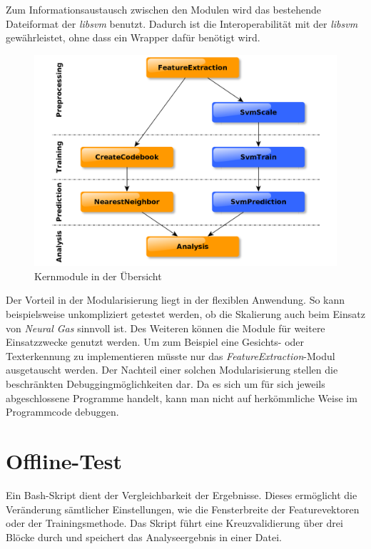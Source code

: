 Zum Informationsaustausch zwischen den Modulen wird das bestehende Dateiformat der \emph{libsvm} benutzt. Dadurch ist die Interoperabilität mit der \emph{libsvm} gewährleistet, ohne dass ein Wrapper dafür benötigt wird.

\begin{figure}[h]
  \centering
  \includegraphics[width=1\textwidth]{images/moduluebersicht}
  \caption{Kernmodule in der Übersicht}
  \label{fig:moduluebersicht}
\end{figure}

Der Vorteil in der Modularisierung liegt in der flexiblen Anwendung. So kann beispielsweise unkompliziert getestet werden, ob die Skalierung auch beim Einsatz von \emph{Neural Gas} sinnvoll ist. Des Weiteren können die Module für weitere Einsatzzwecke genutzt werden. Um zum Beispiel eine Gesichts- oder Texterkennung zu implementieren müsste nur das \emph{FeatureExtraction}-Modul ausgetauscht werden. Der Nachteil einer solchen Modularisierung stellen die beschränkten Debuggingmöglichkeiten dar. Da es sich um für sich jeweils abgeschlossene Programme handelt, kann man nicht auf herkömmliche Weise im Programmcode debuggen.

\section{Offline-Test}
Ein Bash-Skript dient der Vergleichbarkeit der Ergebnisse. Dieses ermöglicht die Veränderung sämtlicher Einstellungen, wie die Fensterbreite der Featurevektoren oder der Trainingsmethode. Das Skript führt eine Kreuzvalidierung über drei Blöcke durch und speichert das Analyseergebnis in einer Datei.

